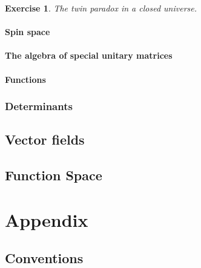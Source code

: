\documentclass[
  11pt,
	colorful,
	raggedright,
]{tufte-style-thesis-flip}
\newtheorem{exercise}{Exercise}[section]
\begin{document}
\begin{exercise}
The twin paradox in a closed universe. 
\end{exercise}

\subsection{Spin space}

\subsection{The algebra of special unitary matrices}

\subsection{Functions}


\section{Determinants}

\chapter{Vector fields}
\label{chap:vector:fields}


\chapter{Function Space}



\part*{Appendix}
\appendix

\chapter{Conventions}

\lipsum \cite{BringhurstEoTS}








\backmatter

\printbibliography
\cleardoublepage
\begin{wide}
\thispagestyle{empty}
\printindex
\end{wide}
\end{document}

